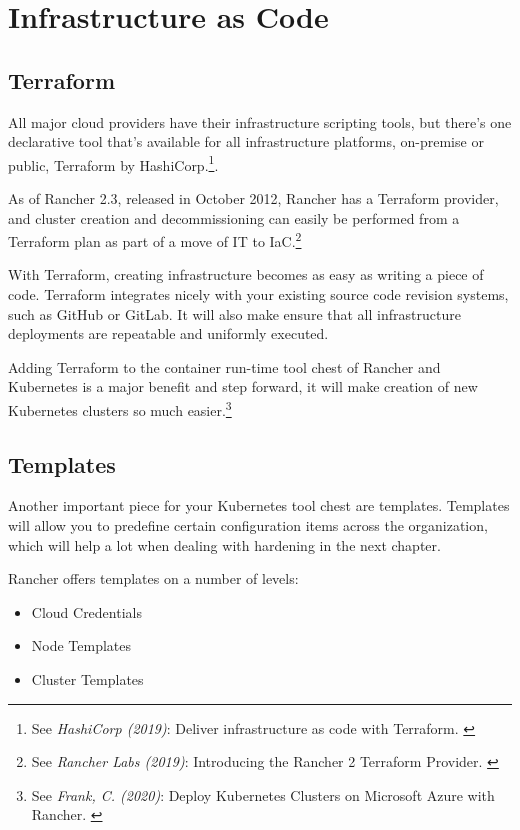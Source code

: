 %
%

\pagebreak
\section{Infrastructure as Code}

\onehalfspacing

\subsection{Terraform}

All major cloud providers have their infrastructure scripting tools, but there's one declarative tool that's available for all infrastructure platforms, on-premise or public, Terraform by HashiCorp.\footnote{See \textit{HashiCorp (2019)}: Deliver infrastructure as code with Terraform. \cite{terraform}}.

As of Rancher 2.3, released in October 2012, Rancher has a Terraform provider, and cluster creation and decommissioning can easily be performed from a Terraform plan as part of a move of IT to IaC.\footnote{See \textit{Rancher Labs (2019)}: Introducing the Rancher 2 Terraform Provider. \cite{terraformProvider}}

With Terraform, creating infrastructure becomes as easy as writing a piece of code. Terraform integrates nicely with your existing source code revision systems, such as GitHub or GitLab. It will also make ensure that all infrastructure deployments are repeatable and uniformly executed.

Adding Terraform to the container run-time tool chest of Rancher and Kubernetes is a major benefit and step forward, it will make creation of new Kubernetes clusters so much easier.\footnote{See \textit{Frank, C. (2020)}: Deploy Kubernetes Clusters on Microsoft Azure with Rancher. \cite{deployAzure}}

\subsection{Templates}

Another important piece for your Kubernetes tool chest are templates. Templates will allow you to predefine certain configuration items across the organization, which will help a lot when dealing with hardening in the next chapter.

Rancher offers templates on a number of levels:

\begin{itemize}
\item Cloud Credentials
\item Node Templates
\item Cluster Templates
\end{itemize}

